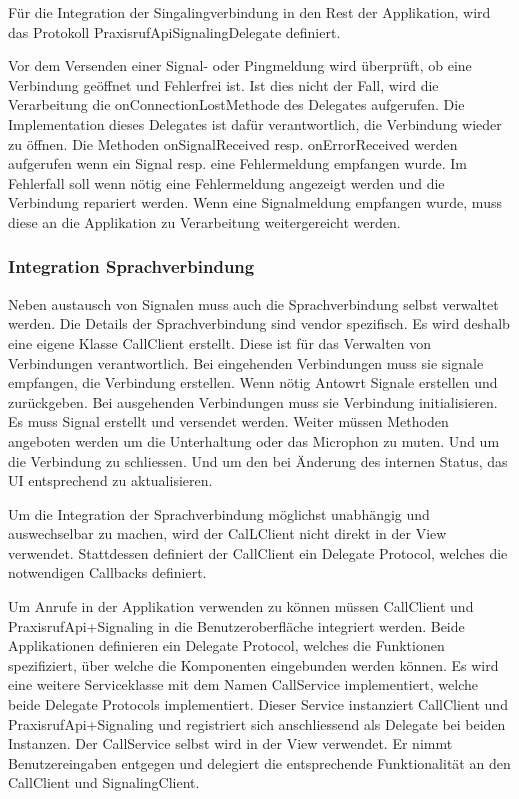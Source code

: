 Für die Integration der Singalingverbindung in den Rest der Applikation, wird das Protokoll PraxisrufApiSignalingDelegate definiert.



Vor dem Versenden einer Signal- oder Pingmeldung wird überprüft, ob eine Verbindung geöffnet und Fehlerfrei ist.
Ist dies nicht der Fall, wird die Verarbeitung die onConnectionLostMethode des Delegates aufgerufen.
Die Implementation dieses Delegates ist dafür verantwortlich, die Verbindung wieder zu öffnen.
Die Methoden onSignalReceived resp. onErrorReceived werden aufgerufen wenn ein Signal resp. eine Fehlermeldung empfangen wurde.
Im Fehlerfall soll wenn nötig eine Fehlermeldung angezeigt werden und die Verbindung repariert werden.
Wenn eine Signalmeldung empfangen wurde, muss diese an die Applikation zu Verarbeitung weitergereicht werden.

\subsubsection{Integration Sprachverbindung}

Neben austausch von Signalen muss auch die Sprachverbindung selbst verwaltet werden.
Die Details der Sprachverbindung sind vendor spezifisch.
Es wird deshalb eine eigene Klasse CallClient erstellt.
Diese ist für das Verwalten von Verbindungen verantwortlich.
Bei eingehenden Verbindungen muss sie signale empfangen, die Verbindung erstellen.
Wenn nötig Antowrt Signale erstellen und zurückgeben.
Bei ausgehenden Verbindungen muss sie Verbindung initialisieren.
Es muss Signal erstellt und versendet werden.
Weiter müssen Methoden angeboten werden um die Unterhaltung oder das Microphon zu muten.
Und um die Verbindung zu schliessen.
Und um den bei Änderung des internen Status, das UI entsprechend zu aktualisieren.

Um die Integration der Sprachverbindung möglichst unabhängig und auswechselbar zu machen, wird der CalLClient nicht direkt in der View verwendet.
Stattdessen definiert der CallClient ein Delegate Protocol, welches die notwendigen Callbacks definiert.



Um Anrufe in der Applikation verwenden zu können müssen CallClient und PraxisrufApi+Signaling in die Benutzeroberfläche integriert werden.
Beide Applikationen definieren ein Delegate Protocol, welches die Funktionen spezifiziert, über welche die Komponenten eingebunden werden können.
Es wird eine weitere Serviceklasse mit dem Namen CallService implementiert, welche beide Delegate Protocols implementiert.
Dieser Service instanziert CallClient und PraxisrufApi+Signaling und registriert sich anschliessend als Delegate bei beiden Instanzen.
Der CallService selbst wird in der View verwendet.
Er nimmt Benutzereingaben entgegen und delegiert die entsprechende Funktionalität an den CallClient und SignalingClient.

